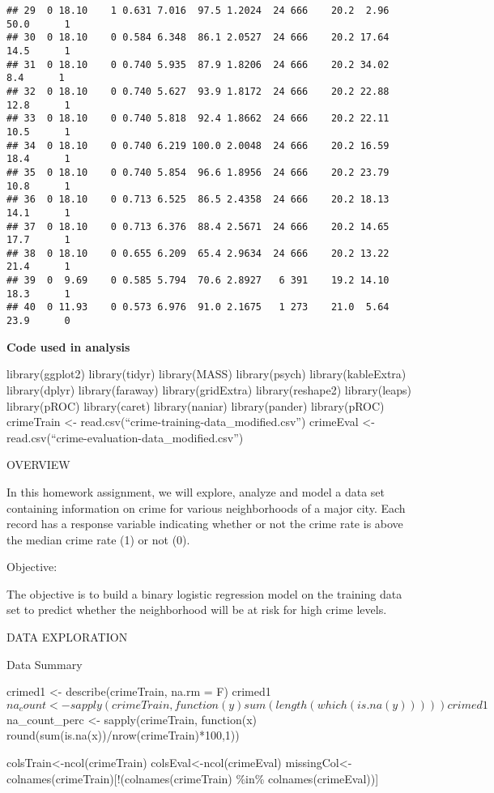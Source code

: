 \documentclass[
]{article}
\begin{document}
\begin{verbatim}
## 29  0 18.10    1 0.631 7.016  97.5 1.2024  24 666    20.2  2.96 50.0      1
## 30  0 18.10    0 0.584 6.348  86.1 2.0527  24 666    20.2 17.64 14.5      1
## 31  0 18.10    0 0.740 5.935  87.9 1.8206  24 666    20.2 34.02  8.4      1
## 32  0 18.10    0 0.740 5.627  93.9 1.8172  24 666    20.2 22.88 12.8      1
## 33  0 18.10    0 0.740 5.818  92.4 1.8662  24 666    20.2 22.11 10.5      1
## 34  0 18.10    0 0.740 6.219 100.0 2.0048  24 666    20.2 16.59 18.4      1
## 35  0 18.10    0 0.740 5.854  96.6 1.8956  24 666    20.2 23.79 10.8      1
## 36  0 18.10    0 0.713 6.525  86.5 2.4358  24 666    20.2 18.13 14.1      1
## 37  0 18.10    0 0.713 6.376  88.4 2.5671  24 666    20.2 14.65 17.7      1
## 38  0 18.10    0 0.655 6.209  65.4 2.9634  24 666    20.2 13.22 21.4      1
## 39  0  9.69    0 0.585 5.794  70.6 2.8927   6 391    19.2 14.10 18.3      1
## 40  0 11.93    0 0.573 6.976  91.0 2.1675   1 273    21.0  5.64 23.9      0
\end{verbatim}

\textbf{Code used in analysis}

library(ggplot2) library(tidyr) library(MASS) library(psych)
library(kableExtra) library(dplyr) library(faraway) library(gridExtra)
library(reshape2) library(leaps) library(pROC) library(caret)
library(naniar) library(pander) library(pROC) crimeTrain \textless-
read.csv(``crime-training-data\_modified.csv'') crimeEval \textless-
read.csv(``crime-evaluation-data\_modified.csv'')

OVERVIEW

In this homework assignment, we will explore, analyze and model a data
set containing information on crime for various neighborhoods of a major
city. Each record has a response variable indicating whether or not the
crime rate is above the median crime rate (1) or not (0).

Objective:

The objective is to build a binary logistic regression model on the
training data set to predict whether the neighborhood will be at risk
for high crime levels.

DATA EXPLORATION

Data Summary

crimed1 \textless- describe(crimeTrain, na.rm = F)
crimed1\(na_count <- sapply(crimeTrain, function(y) sum(length(which(is.na(y))))) crimed1\)na\_count\_perc
\textless- sapply(crimeTrain, function(x)
round(sum(is.na(x))/nrow(crimeTrain)*100,1))

colsTrain\textless-ncol(crimeTrain) colsEval\textless-ncol(crimeEval)
missingCol\textless-colnames(crimeTrain){[}!(colnames(crimeTrain) \%in\%
colnames(crimeEval)){]}
\end{document}
